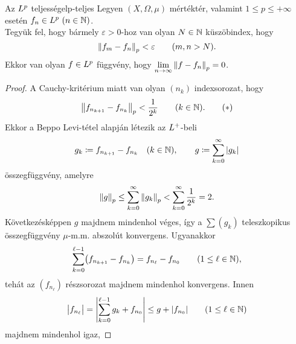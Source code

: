 \documentclass[
]{elteikthesis}[2024/04/26]
\begin{document}
	\begin{theorem}{Az \( \Lebesgue[p] \) teljessége}{lp-teljes}
		Legyen \( (X, \Omega, \mu) \) mértéktér, 
		valamint \( 1 \leq p \leq +\infty \) esetén \( f_n \in \Lebesgue[p] \ (n \in \N) \).\\[6pt]
		Tegyük fel, hogy bármely \( \varepsilon > 0 \)-hoz van olyan \( N \in \mathbb{N} \) küszöbindex, hogy
		\[
			\norm{f_m - f_n}_p < \varepsilon \qquad (m,n > N).
		\]
		Ekkor van olyan \( f \in \Lebesgue[p] \) függvény,
		hogy \( \lim\limits_{n \to \infty} \norm{f - f_n}_p = 0 \).
	\end{theorem}
	\begin{proof}
		A Cauchy-kritérium miatt van olyan \( (n_k) \) indexsorozat, hogy
		\begin{equation}\label{eq:lp-teljes-cauchy-becslés}
			\norm\big{ f_{n_{k + 1}} - f_{n_k} }_p < \frac{1}{2^k} 
			\qquad (k \in \mathbb{N}).
			\tag{\( * \)}
		\end{equation}
		Ekkor a Beppo Levi-tétel alapján létezik az \( L^+ \)-beli
		\[
			g_k \coloneq f_{n_{k + 1}} - f_{n_k} \quad (k \in \mathbb{N}), \qquad
			g \coloneq \sum_{k=0}^{\infty} \abs{ g_k }
		\]
		összegfüggvény, amelyre
		\[
			\norm{g}_p \leq
			\sum_{k=0}^{\infty} \norm{ g_k }_p <
			\sum_{k=0}^{\infty} \frac{1}{2^k} =
			2.
		\]
		Következésképpen \( g \) majdnem mindenhol véges, 
		így a \( \sum( g_k ) \) teleszkopikus összegfüggvény \( \mu \)-m.m. abszolút konvergens.
		Ugyanakkor
		\[
			\sum_{k=0}^{\ell - 1} \bigl( f_{n_{k + 1}} - f_{n_k} \bigr) =
			f_{n_\ell} - f_{n_0}
			\qquad (1 \leq \ell \in \mathbb{N}),
		\]
		tehát az \( (f_{n_\ell}) \) részsorozat majdnem mindenhol konvergens. Innen
		\[
			\abs\big{ f_{n_\ell} } =
			\abs\Bigg{ \sum_{k=0}^{\ell - 1} g_k + f_{n_0} } \leq g + \abs{ f_{n_0} }
			\qquad (1 \leq \ell \in \mathbb{N})
		\]
		majdnem mindenhol igaz,
		\marginnote{
}
\end{proof}
\end{document}
